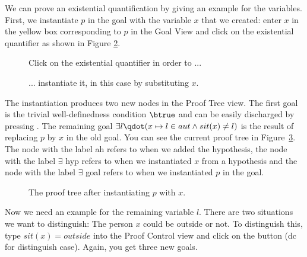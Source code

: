 We can prove an existential quantification by giving an example for the variables. First, we
  instantiate $p$ in the goal with the variable $x$ that we created: enter $x$ in the yellow box corresponding to $p$
  in the \textsf{Goal View} and click on the existential quantifier as shown in Figure \ref{fig_tut_10_instantiate_p}.

\begin{figure}[!ht]
\begin{center}
	\caption{Click on the existential quantifier in order to ...}
	\label{fig_tut_10_instantiate_x}
\end{center}
\end{figure}

\begin{figure}[!ht]
\begin{center}
	\caption{... instantiate it, in this case by substituting $x$.}
	\label{fig_tut_10_instantiate_p}
\end{center}
\end{figure}


The instantiation produces two new nodes in the \textsf{Proof Tree} view. The first goal is the trivial well-definedness condition $\btrue$ and
  can be easily discharged by pressing .
The remaining goal $\exists l\qdot (x \mapsto  l \in  aut \land  sit(x) \neq l)$ is the result of replacing $p$ by $x$ in the old goal.
You can see the current proof tree in Figure~\ref{fig_tut_10_proof_tree}. The node with the label \textsf{ah} refers to when we added the hypothesis, the node with the label \textsf{$\exists$ hyp} refers to when we instantiated $x$ from a hypothesis and the node with the label \textsf{$\exists$ goal} refers to when we instantiated $p$ in the goal.

\begin{figure}[!ht]
\begin{center}
	\caption{The proof tree after instantiating $p$ with $x$.}
	\label{fig_tut_10_proof_tree}
\end{center}
\end{figure}

Now we need an example for the remaining variable $l$.
There are two situations we want to distinguish: The person $x$ could be outside or not.
To distinguish this, type $sit(x) = outside$ into the \textsf{Proof Control} view and click on the button  (\textsf{dc} for distinguish case).
Again, you get three new goals.

